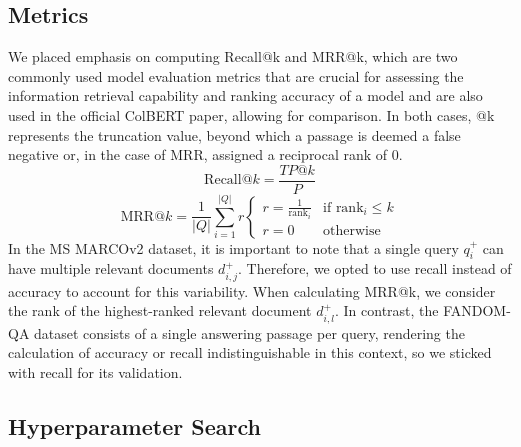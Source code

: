 \documentclass[11pt]{article}
\begin{document}
\subsection{Metrics}
\label{chap:metrics}
We placed emphasis on computing Recall@k and MRR@k, which are two commonly used model evaluation metrics that are crucial for assessing the information retrieval capability and ranking accuracy of a model and are also used in the official ColBERT paper, allowing for comparison. 
In both cases, @k represents the truncation value, beyond which a passage is deemed a false negative or, in the case of MRR, assigned a reciprocal rank of 0. 
\[
\text{Recall@}k = \frac{TP@k}{P} \]
\[
\text{MRR@}k = \frac{1}{|Q|} \sum_{i=1}^{|Q|} r
\begin{cases}
r = \frac{1}{\text{rank}_i} & \text{if } \text{rank}_i \leq k \\
r =  0 & \text{otherwise}
\end{cases}
\]
In the MS MARCOv2 dataset, it is important to note that a single query $q_i^+$ can have multiple relevant documents $d_{i,j}^+$. Therefore, we opted to use recall instead of accuracy to account for this variability. When calculating MRR@k, we consider the rank of the highest-ranked relevant document $d_{i,l}^+$. In contrast, the FANDOM-QA dataset consists of a single answering passage per query, rendering the calculation of accuracy or recall indistinguishable in this context, so we sticked with recall for its validation.

\subsection{Hyperparameter Search} \label{hparameter-chapter}
\end{document}
